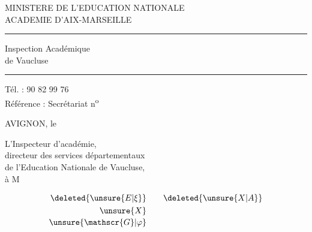 MINISTERE DE L'EDUCATION NATIONALE\\
ACADEMIE D'AIX-MARSEILLE\\
\rule{1cm}{0.3pt}

Inspection Académique\\
de Vaucluse\\
\rule{1cm}{0.3pt}

Tél. : 90 82 99 76\\
Référence : Secrétariat n\textsuperscript{o}

AVIGNON, le

L'Inspecteur d'académie,\\
directeur des services départementaux\\
de l'Education Nationale de Vaucluse,\\
à M


\diagram{\handwritten{\begin{tikzcd}[ampersand replacement=\&,column sep=tiny,row sep=tiny]
 \& {} \& \\
 {}\arrow[ur]\arrow[dr] \& \& {}\arrow[ul,no head]\arrow[dl,no head]\\
 \& {} \& \\[-1ex]
 \bullet \& \&
\end{tikzcd}}}


\[
 \begin{aligned}
 \deleted{\unsure{E|\xi}}&\qquad\deleted{\unsure{X|A}}\\
 \unsure{X}&\\[-.3ex]
 \unsure{\mathscr{G}|\varphi}&
 \end{aligned}
\]

